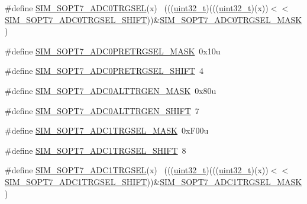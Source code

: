 \begin{DoxyCompactItemize}
\item 
\#define \hyperlink{group___s_i_m___register___masks_ga3688192d4b3dce98ac9b670242a38b23}{S\+I\+M\+\_\+\+S\+O\+P\+T7\+\_\+\+A\+D\+C0\+T\+R\+G\+S\+EL}(x)                                ~(((\hyperlink{_p_e___types_8h_a33594304e786b158f3fb30289278f5af}{uint32\+\_\+t})(((\hyperlink{_p_e___types_8h_a33594304e786b158f3fb30289278f5af}{uint32\+\_\+t})(x))$<$$<$\hyperlink{group___s_i_m___register___masks_ga914ced2a5cf4e7f37371d52d34d4a930}{S\+I\+M\+\_\+\+S\+O\+P\+T7\+\_\+\+A\+D\+C0\+T\+R\+G\+S\+E\+L\+\_\+\+S\+H\+I\+FT}))\&\hyperlink{group___s_i_m___register___masks_gaeda70babef834cacace2c775d62bb4ae}{S\+I\+M\+\_\+\+S\+O\+P\+T7\+\_\+\+A\+D\+C0\+T\+R\+G\+S\+E\+L\+\_\+\+M\+A\+SK})
\item 
\#define \hyperlink{group___s_i_m___register___masks_ga74544c6c9d4fbc593884681ac79c796f}{S\+I\+M\+\_\+\+S\+O\+P\+T7\+\_\+\+A\+D\+C0\+P\+R\+E\+T\+R\+G\+S\+E\+L\+\_\+\+M\+A\+SK}~0x10u
\item 
\#define \hyperlink{group___s_i_m___register___masks_gaee870f942318f14376ee9e6d5558e2ff}{S\+I\+M\+\_\+\+S\+O\+P\+T7\+\_\+\+A\+D\+C0\+P\+R\+E\+T\+R\+G\+S\+E\+L\+\_\+\+S\+H\+I\+FT}~4
\item 
\#define \hyperlink{group___s_i_m___register___masks_ga6390cd75db35ecc6c5fc6d5b0d417a7d}{S\+I\+M\+\_\+\+S\+O\+P\+T7\+\_\+\+A\+D\+C0\+A\+L\+T\+T\+R\+G\+E\+N\+\_\+\+M\+A\+SK}~0x80u
\item 
\#define \hyperlink{group___s_i_m___register___masks_gaa20ed5f5ab9cf02714a993c3996adcc5}{S\+I\+M\+\_\+\+S\+O\+P\+T7\+\_\+\+A\+D\+C0\+A\+L\+T\+T\+R\+G\+E\+N\+\_\+\+S\+H\+I\+FT}~7
\item 
\#define \hyperlink{group___s_i_m___register___masks_ga1c262a802f5341d2b3f9e3750fec1244}{S\+I\+M\+\_\+\+S\+O\+P\+T7\+\_\+\+A\+D\+C1\+T\+R\+G\+S\+E\+L\+\_\+\+M\+A\+SK}~0x\+F00u
\item 
\#define \hyperlink{group___s_i_m___register___masks_ga41e9a42e300b2132d8877fb9a01a6fa1}{S\+I\+M\+\_\+\+S\+O\+P\+T7\+\_\+\+A\+D\+C1\+T\+R\+G\+S\+E\+L\+\_\+\+S\+H\+I\+FT}~8
\item 
\#define \hyperlink{group___s_i_m___register___masks_gaf9d90181fb7f7b1689b6835b5abf693f}{S\+I\+M\+\_\+\+S\+O\+P\+T7\+\_\+\+A\+D\+C1\+T\+R\+G\+S\+EL}(x)                                ~(((\hyperlink{_p_e___types_8h_a33594304e786b158f3fb30289278f5af}{uint32\+\_\+t})(((\hyperlink{_p_e___types_8h_a33594304e786b158f3fb30289278f5af}{uint32\+\_\+t})(x))$<$$<$\hyperlink{group___s_i_m___register___masks_ga41e9a42e300b2132d8877fb9a01a6fa1}{S\+I\+M\+\_\+\+S\+O\+P\+T7\+\_\+\+A\+D\+C1\+T\+R\+G\+S\+E\+L\+\_\+\+S\+H\+I\+FT}))\&\hyperlink{group___s_i_m___register___masks_ga1c262a802f5341d2b3f9e3750fec1244}{S\+I\+M\+\_\+\+S\+O\+P\+T7\+\_\+\+A\+D\+C1\+T\+R\+G\+S\+E\+L\+\_\+\+M\+A\+SK})

\end{DoxyCompactItemize}
